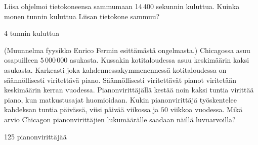 \begin{tehtavasivu}
\begin{tehtava}
Liisa ohjelmoi tietokoneensa sammumaan 14\,400 sekunnin kuluttua. Kuinka monen tunnin kuluttua Liisan tietokone sammuu?
\begin{vastaus}
4 tunnin kuluttua
\end{vastaus}
\end{tehtava}

\begin{tehtava}
(Muunnelma fyysikko Enrico Fermin esittämästä ongelmasta.) Chicagossa asuu osapuilleen
$5\,000\,000$ asukasta. Kussakin kotitaloudessa asuu keskimäärin kaksi asukasta.
Karkeasti joka kahdennessakymmenennessä kotitaloudessa on säännöllisesti viritettävä piano.
Säännöllisesti viritettävät pianot viritetään keskimäärin kerran vuodessa.
Pianonvirittäjällä kestää noin kaksi tuntia virittää piano, kun matkustusajat huomioidaan.
Kukin pianonvirittäjä työskentelee kahdeksan tuntia päivässä, viisi päivää viikossa
ja $50$ viikkoa vuodessa. Mikä arvio Chicagon pianonvirittäjien lukumäärälle saadaan näillä
luvuarvoilla?
\begin{vastaus}
125 pianonvirittäjää
\end{vastaus}
\end{tehtava}

\end{tehtavasivu}
